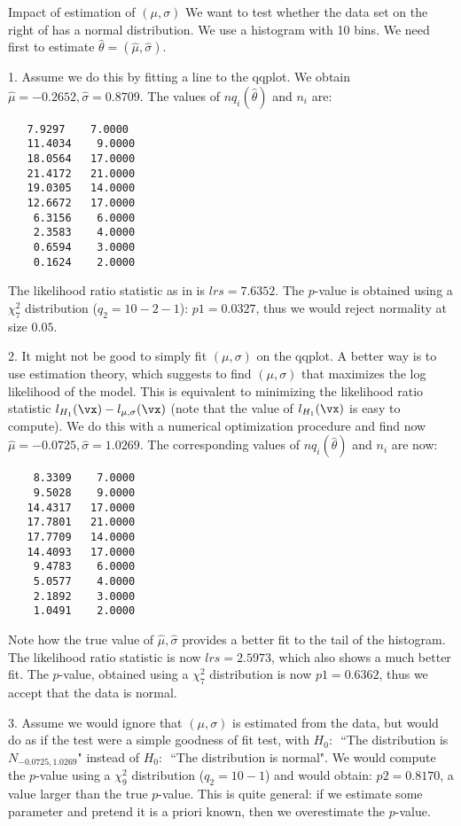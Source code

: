 \begin{exnn}{Impact of estimation of $(\mu, \sigma)$}
We want to test whether the data set on the right of  has a normal distribution.
We use a histogram with 10 bins.
We need first to estimate $\hat{\theta}=(\hat{\mu},\hat{\sigma})$.

1. Assume we do this by fitting a line to the qqplot. We obtain $\hat{\mu}=-0.2652,\hat{\sigma}     =    0.8709$.
The values of $n q_i(\hat{\theta})$ and $n_i$ are:
{\footnotesize
\begin{verbatim}
   7.9297    7.0000
   11.4034    9.0000
   18.0564   17.0000
   21.4172   21.0000
   19.0305   14.0000
   12.6672   17.0000
    6.3156    6.0000
    2.3583    4.0000
    0.6594    3.0000
    0.1624    2.0000
\end{verbatim}}
The likelihood ratio statistic as in  is
$lrs =7.6352$. The $p$-value is obtained using a $\chi^2_7$
distribution ($q_2=10-2-1$): $p1 =    0.0327$, thus we would
reject normality at size $0.05$.

2. It might not be good to simply fit $(\mu, \sigma)$ on the
qqplot. A better way is to use estimation theory, which
suggests to find $(\mu, \sigma)$ that maximizes the log
likelihood of the model. This is equivalent to minimizing the
likelihood ratio statistic $l_{H_1}({\vx})-l_{\mu,
\sigma}({\vx})$ (note that the value of $l_{H_1}({\vx})$ is
easy to compute). We do this with a numerical optimization
procedure and find now $\hat{\mu}=-0.0725,\hat{\sigma} =
1.0269$. The corresponding values of $n q_i(\hat{\theta})$ and
$n_i$ are now: {\footnotesize
\begin{verbatim}
    8.3309    7.0000
    9.5028    9.0000
   14.4317   17.0000
   17.7801   21.0000
   17.7709   14.0000
   14.4093   17.0000
    9.4783    6.0000
    5.0577    4.0000
    2.1892    3.0000
    1.0491    2.0000
\end{verbatim}}
Note how the true value of $\hat{\mu},\hat{\sigma}$ provides a
better fit to the tail of the histogram. The likelihood ratio
statistic  is now  $lrs =2.5973$, which also shows a much
better fit. The $p$-value, obtained using a $\chi^2_7$
distribution is now $p1 =    0.6362$, thus we accept that the
data is normal.

3. Assume we would ignore that $(\mu, \sigma)$ is estimated
from the data, but would do as if the test were a simple
goodness of fit test, with $H_0:$~``The distribution is
$N_{-0.0725,1.0269}$" instead of $H_0:$~``The distribution is
normal". We would compute the $p$-value using a $\chi^2_9$
distribution ($q_2=10-1$) and would obtain: $p2 =   0.8170$, a
value larger than the true $p$-value. This is quite general: if
we estimate some parameter and pretend it is a priori known,
then we overestimate the $p$-value.
\end{exnn}
